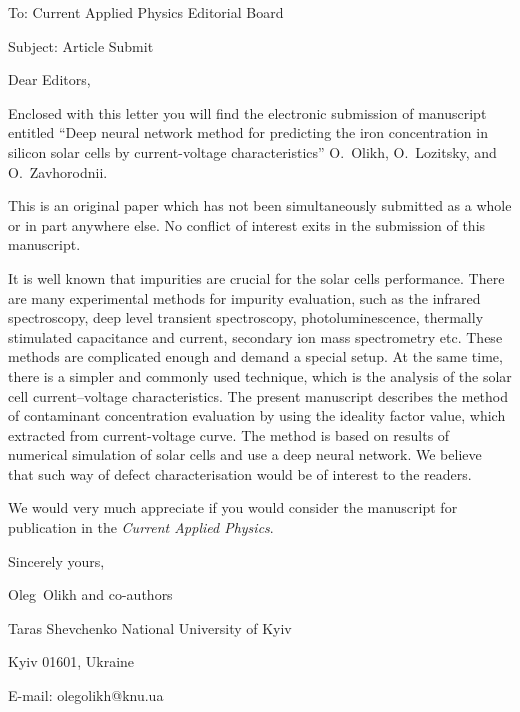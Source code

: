 \documentclass[preprint]{elsarticle}
\begin{document}
To:
Current Applied Physics Editorial Board


Subject:
Article Submit

\vspace{5mm}
Dear Editors,

\vspace{3mm}
Enclosed with this letter you will find the electronic submission of manuscript entitled
``Deep neural network method for predicting the iron concentration in silicon solar cells by current-voltage characteristics'' O.~Olikh, O.~Lozitsky, and O.~Zavhorodnii.



This is an original paper which has not been simultaneously submitted as a whole or in part anywhere else.
No conflict of interest exits in the submission of this manuscript.


It is well known that impurities are crucial for the solar cells performance.
There are many experimental methods for impurity evaluation, such as the infrared spectroscopy, deep level transient spectroscopy, photoluminescence, thermally stimulated capacitance and current, secondary ion mass spectrometry etc.
These methods are complicated enough and demand a special setup.
At the same time, there is a simpler and commonly used technique, which
is the analysis of the solar cell current--voltage characteristics.
The present manuscript describes the method of contaminant concentration evaluation by
using the ideality factor value, which extracted from current-voltage curve.
The method is based on results of numerical simulation of solar cells and use a deep neural network.
We believe that such way of defect characterisation would be of interest to the readers.

We would  very much appreciate if you would consider the manuscript for publication in the \emph{Current Applied Physics}.

\vspace{3mm}

Sincerely yours,

Oleg~Olikh and co-authors


Taras Shevchenko National University of Kyiv


Kyiv 01601, Ukraine

E-mail: olegolikh@knu.ua


\end{document}
